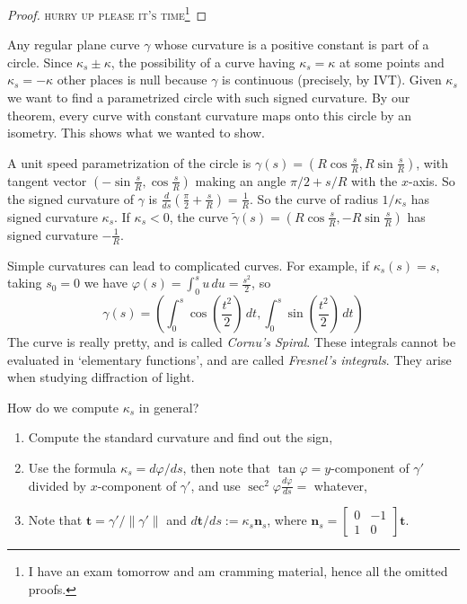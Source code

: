 \begin{proof}
    \textsc{hurry up please it's time}\footnote{I have an exam tomorrow and am cramming material, hence all the omitted proofs.}
\end{proof}
\begin{example}
    Any regular plane curve $\gamma $ whose curvature is a positive constant is part of a circle. Since $\kappa_s\pm \kappa$, the possibility of a curve having $\kappa_s=\kappa$ at some points and $\kappa_s=-\kappa$ other places is null because $\gamma $ is continuous (precisely, by IVT). Given $\kappa_s$ we want to find a parametrized circle with such signed curvature. By our theorem, every curve with constant curvature maps onto this circle by an isometry. This shows what we wanted to show.

    A unit speed parametrization of the circle is $\gamma (s)=\left( R \cos \frac{s}{R}, R \sin \frac{s}{R} \right) $, with tangent vector $\left( -\sin \frac{s}{R}, \cos \frac{s}{R} \right) $ making an angle $\pi /2 + s /R$ with the $x$-axis. So the signed curvature of $\gamma $ is $\frac{d}{ds}\left( \frac{\pi}{2}+\frac{s}{R} \right) =\frac{1}{R}$. So the curve of radius $1 /\kappa_s$ has signed curvature $\kappa_s$. If $\kappa_s<0$, the curve $\widetilde \gamma (s)=\left( R \cos \frac{s}{R}, - R \sin \frac{s}{R} \right) $ has signed curvature $- \frac{1}{R}.$
\end{example}
\begin{example}
    Simple curvatures can lead to complicated curves. For example, if $\kappa_s(s)=s$, taking $s_0=0$ we have $\varphi (s)=\int_{0}^{s} u \, du= \frac{s^2}{2}$, so \[
        \gamma (s)= \left( \int_{0}^{s} \cos\left( \frac{t^2}{2} \right)  \, d t, \int_{0}^{s} \sin \left( \frac{t^2}{2} \right)  \, dt\right) 
    \] The curve is really pretty, and is called \emph{Cornu's Spiral}. These integrals cannot be evaluated in `elementary functions', and are called \emph{Fresnel's integrals}. They arise when studying diffraction of light.
\end{example}
\begin{remark}
How do we compute $\kappa_s$ in general? 
\begin{enumerate}[label=(\arabic*)]
    \item Compute the standard curvature and find out the sign,
    \item Use the formula $\kappa_s= d \varphi /ds$, then note that $\tan \varphi =y$-component of $\gamma '$ divided by $x$-component of $\gamma '$, and use $\sec ^2 \varphi \frac{d \varphi }{ds}=$ whatever,
    \item Note that $\mathbf t=\gamma ' /\|\gamma '\|$ and $d \mathbf t /ds:=\kappa_s \mathbf n_s$, where $\mathbf n_s=
        \left[ \begin{smallmatrix}
                0 & -1 \\ 1 &0 
        \end{smallmatrix} \right] \mathbf t$.
\end{enumerate}
\end{remark}

